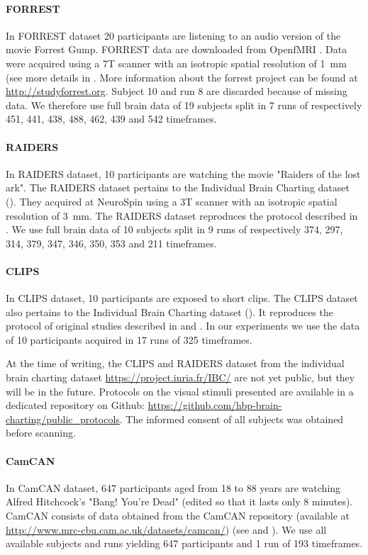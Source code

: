 \paragraph{FORREST}
In FORREST dataset 20 participants are listening to an audio version of the movie Forrest Gump.
%
FORREST data are downloaded from OpenfMRI \cite{poldrack2013toward}. 
%
Data were acquired using a 7T scanner with an isotropic spatial resolution of 1 mm (see more details in \cite{hanke2014high}.
%
More information about the forrest project can be found at \url{http://studyforrest.org}.
%
Subject 10 and run 8 are discarded because of missing data.
%
We therefore use full brain data of 19 subjects split in 7 runs of respectively 451, 441, 438, 488, 462, 439 and 542 timeframes.
 
\paragraph{RAIDERS}
In RAIDERS dataset, 10 participants are watching the movie "Raiders of the lost ark".
% 
The RAIDERS dataset pertains to the Individual Brain Charting dataset (\cite{ibc}).
% 
They acquired at NeuroSpin using a 3T scanner with an isotropic spatial resolution of 3 mm.
% 
The RAIDERS dataset reproduces the protocol described in \cite{haxby2011common}.
%
We use full brain data of 10 subjects split in 9 runs of respectively 374, 297, 314, 379, 347, 346, 350, 353 and 211 timeframes.

\paragraph{CLIPS}
In CLIPS dataset, 10 participants are exposed to short clips. 
%
The CLIPS dataset also pertains to the Individual Brain Charting dataset (\cite{ibc}).
%
It reproduces the protocol of original studies described in \cite{nishimoto2011reconstructing} and \cite{huth2012continuous}.
%
In our experiments we use the data of 10 participants acquired in 17 runs of 325 timeframes.

At the time of writing, the CLIPS and RAIDERS dataset from the individual brain charting dataset \url{https://project.inria.fr/IBC/} are not yet public, but they will be in the future. Protocols on the visual stimuli presented are available in a dedicated repository on Github: \url{https://github.com/hbp-brain-charting/public_protocols}. The informed consent of all subjects was obtained before scanning.

\paragraph{CamCAN}
In CamCAN dataset, 647 participants aged from 18 to 88 years are watching Alfred Hitchcock's "Bang! You're Dead" (edited so that it lasts only 8 minutes).
%
CamCAN consists of data obtained from the CamCAN repository (available at \url{http://www.mrc-cbu.cam.ac.uk/datasets/camcan/}) (see \cite{taylor2017cambridge} and \cite{shafto2014cambridge}).
%
We use all available subjects and runs yielding 647 participants and 1 run of 193 timeframes.

